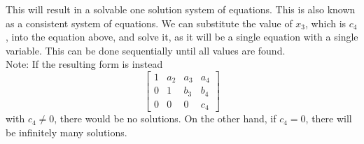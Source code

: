 \documentclass[nobib]{tufte-handout}
\begin{document}
This will result in a solvable one solution system of equations. This is also known as a consistent system of equations. We can substitute the value of $x_3$, which is $c_4$, into the equation above, and solve it, as it will be a single equation with a single variable. This can be done sequentially until all values are found.\\
Note: If the resulting form is instead
\begin{equation*}
  \begin{bmatrix}
    1 & a_2 & a_3 & a_4\\
    0 & 1 & b_3 & b_4 \\
    0 & 0 & 0 & c_4
 \end{bmatrix}  
\end{equation*}
with $c_4 \neq 0$, there would be no solutions. On the other hand, if $c_4 = 0$, there will be infinitely many solutions.
\pagebreak
\end{document}
